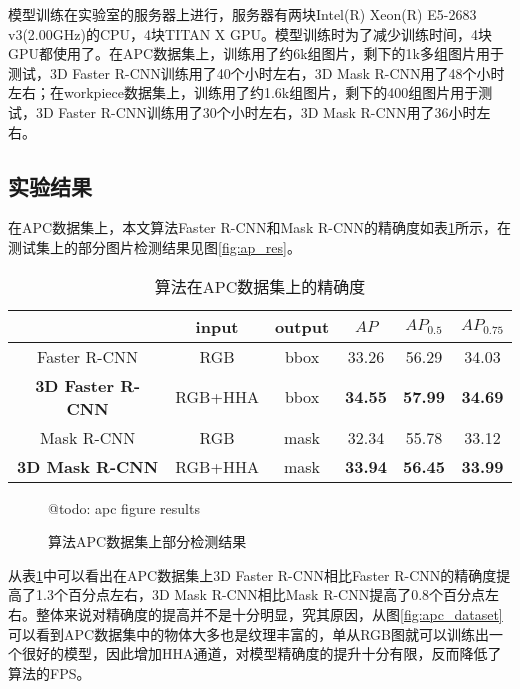 {\kai 模型训练}在实验室的服务器上进行，服务器有两块Intel(R) Xeon(R) E5-2683 v3(2.00GHz)的CPU，4块TITAN X GPU。模型训练时为了减少训练时间，4块GPU都使用了。在APC数据集上，训练用了约6k组图片，剩下的1k多组图片用于测试，3D Faster R-CNN训练用了40个小时左右，3D Mask R-CNN用了48个小时左右；在workpiece数据集上，训练用了约1.6k组图片，剩下的400组图片用于测试，3D Faster R-CNN训练用了30个小时左右，3D Mask R-CNN用了36小时左右。

\subsection{实验结果}
在APC数据集上，本文算法Faster R-CNN和Mask R-CNN的精确度如表\ref{tab:ap1}所示，在测试集上的部分图片检测结果见图\ref{fig:ap_res}。
\begin{table}[ht]
  \centering
  \caption{算法在APC数据集上的精确度}
    \begin{tabular}{cccccc}
      \toprule
      &input&output&$AP$&$AP_{0.5}$&$AP_{0.75}$ \\
      \midrule
      Faster R-CNN&RGB&bbox&33.26&56.29&34.03 \\
      \bf{3D Faster R-CNN}&RGB+HHA&bbox&\bf{34.55}&\bf{57.99}&\bf{34.69} \\
      Mask R-CNN&RGB&mask&32.34&55.78&33.12 \\
      \bf{3D Mask R-CNN}&RGB+HHA&mask&\bf{33.94}&\bf{56.45}&\bf{33.99} \\
      \bottomrule
    \end{tabular}
  \label{tab:ap1}
\end{table}
\begin{figure}[ht]
  \centering
  @todo: apc figure results
  \caption{算法APC数据集上部分检测结果}
  \label{fig:apc_res}
\end{figure}
从表\ref{tab:ap1}中可以看出在APC数据集上3D Faster R-CNN相比Faster R-CNN的精确度提高了1.3个百分点左右，3D Mask R-CNN相比Mask R-CNN提高了0.8个百分点左右。整体来说对精确度的提高并不是十分明显，究其原因，从图\ref{fig:apc_dataset}可以看到APC数据集中的物体大多也是纹理丰富的，单从RGB图就可以训练出一个很好的模型，因此增加HHA通道，对模型精确度的提升十分有限，反而降低了算法的FPS。

